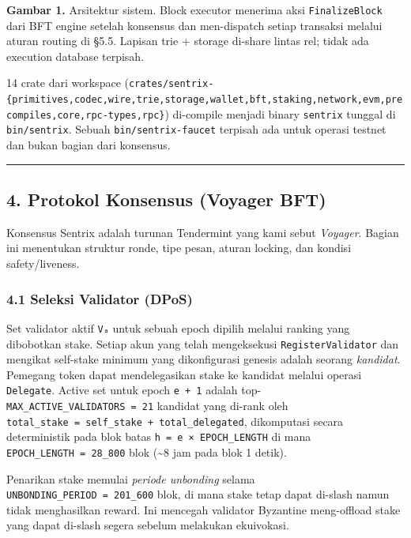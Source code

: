 \documentclass[11pt,a4paper]{article}
\begin{document}
\textbf{Gambar 1.} Arsitektur sistem. Block executor menerima aksi \texttt{FinalizeBlock} dari BFT engine setelah konsensus dan men-dispatch setiap transaksi melalui aturan routing di §5.5. Lapisan trie + storage di-share lintas rel; tidak ada execution database terpisah.

14 crate dari workspace (\texttt{crates/sentrix-\{primitives,codec,wire,trie,storage,wallet,bft,staking,network,evm,precompiles,core,rpc-types,rpc\}}) di-compile menjadi binary \texttt{sentrix} tunggal di \texttt{bin/sentrix}. Sebuah \texttt{bin/sentrix-faucet} terpisah ada untuk operasi testnet dan bukan bagian dari konsensus.

\begin{center}\rule{0.5\linewidth}{0.5pt}\end{center}

\hypertarget{protokol-konsensus-voyager-bft}{%
\subsection{4. Protokol Konsensus (Voyager BFT)}\label{protokol-konsensus-voyager-bft}}

Konsensus Sentrix adalah turunan Tendermint yang kami sebut \emph{Voyager}. Bagian ini menentukan struktur ronde, tipe pesan, aturan locking, dan kondisi safety/liveness.

\hypertarget{seleksi-validator-dpos}{%
\subsubsection{4.1 Seleksi Validator (DPoS)}\label{seleksi-validator-dpos}}

Set validator aktif \texttt{Vₐ} untuk sebuah epoch dipilih melalui ranking yang dibobotkan stake. Setiap akun yang telah mengeksekusi \texttt{RegisterValidator} dan mengikat self-stake minimum yang dikonfigurasi genesis adalah seorang \emph{kandidat}. Pemegang token dapat mendelegasikan stake ke kandidat melalui operasi \texttt{Delegate}. Active set untuk epoch \texttt{e\ +\ 1} adalah top-\texttt{MAX\_ACTIVE\_VALIDATORS\ =\ 21} kandidat yang di-rank oleh \texttt{total\_stake\ =\ self\_stake\ +\ total\_delegated}, dikomputasi secara deterministik pada blok batas \texttt{h\ =\ e\ ×\ EPOCH\_LENGTH} di mana \texttt{EPOCH\_LENGTH\ =\ 28\_800} blok (\textasciitilde8 jam pada blok 1 detik).

Penarikan stake memulai \emph{periode unbonding} selama \texttt{UNBONDING\_PERIOD\ =\ 201\_600} blok, di mana stake tetap dapat di-slash namun tidak menghasilkan reward. Ini mencegah validator Byzantine meng-offload stake yang dapat di-slash segera sebelum melakukan ekuivokasi.
\end{document}
